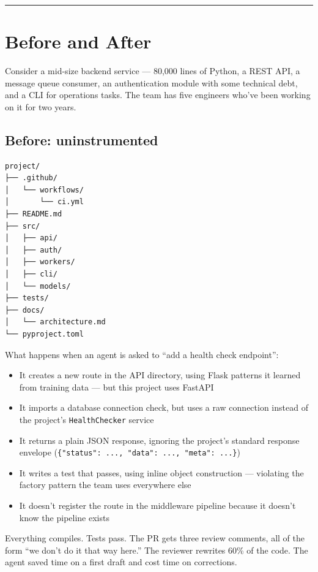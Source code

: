\documentclass[
  a4paper,
  DIV=11,
  numbers=noendperiod]{scrreprt}
\providecommand{\tightlist}{%
  \setlength{\itemsep}{0pt}\setlength{\parskip}{0pt}}
\begin{document}
\begin{center}\rule{0.5\linewidth}{0.5pt}\end{center}

\section{Before and After}\label{before-and-after}

Consider a mid-size backend service --- 80,000 lines of Python, a REST
API, a message queue consumer, an authentication module with some
technical debt, and a CLI for operations tasks. The team has five
engineers who've been working on it for two years.

\subsection{Before: uninstrumented}\label{before-uninstrumented}

\begin{verbatim}
project/
├── .github/
│   └── workflows/
│       └── ci.yml
├── README.md
├── src/
│   ├── api/
│   ├── auth/
│   ├── workers/
│   ├── cli/
│   └── models/
├── tests/
├── docs/
│   └── architecture.md
└── pyproject.toml
\end{verbatim}

What happens when an agent is asked to ``add a health check endpoint'':

\begin{itemize}
\tightlist
\item
  It creates a new route in the API directory, using Flask patterns it
  learned from training data --- but this project uses FastAPI
\item
  It imports a database connection check, but uses a raw connection
  instead of the project's \texttt{HealthChecker} service
\item
  It returns a plain JSON response, ignoring the project's standard
  response envelope
  (\texttt{\{"status":\ ...,\ "data":\ ...,\ "meta":\ ...\}})
\item
  It writes a test that passes, using inline object construction ---
  violating the factory pattern the team uses everywhere else
\item
  It doesn't register the route in the middleware pipeline because it
  doesn't know the pipeline exists
\end{itemize}

Everything compiles. Tests pass. The PR gets three review comments, all
of the form ``we don't do it that way here.'' The reviewer rewrites 60\%
of the code. The agent saved time on a first draft and cost time on
corrections.
\end{document}
